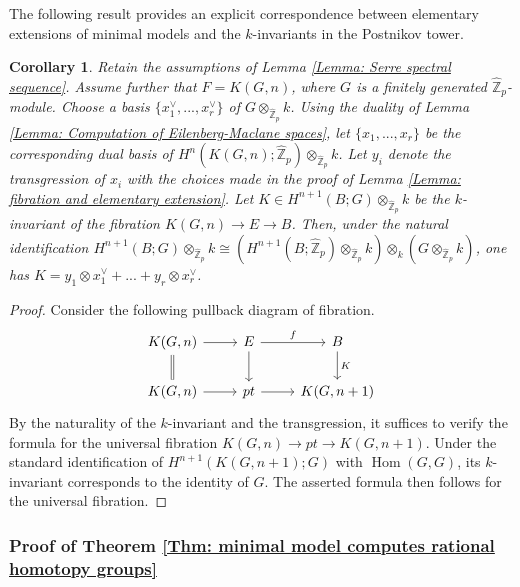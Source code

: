 \documentclass[11pt]{amsart}
\newtheorem{corollary}[theorem]{Corollary}
\theoremstyle{definition}
\numberwithin{equation}{section}
\numberwithin{equation}{section}
\newcommand\ZZ{\mathbb{Z}}
\DeclareMathOperator{\homo}{Hom}
\begin{document}
The following result provides an explicit  correspondence between elementary extensions of minimal models and the $k$-invariants in the Postnikov tower.

\begin{corollary}\label{Cor: k-invariant computation}
Retain the assumptions of Lemma \ref{Lemma: Serre spectral sequence}. Assume further that $F=K(G,n)$, where $G$ is a finitely generated $\widehat{\ZZ}_p$-module. Choose a basis $\{x^{\vee}_1,...,x^{\vee}_r\}$ of $G\otimes_{\widehat{\ZZ}_p} k$. Using the duality of Lemma \ref{Lemma: Computation of Eilenberg-Maclane spaces}, let $\{x_1,...,x_r\}$ be the corresponding dual basis of $H^n(K(G,n);\widehat{\ZZ}_p)\otimes_{\widehat{\ZZ}_p} k$. Let $y_i$ denote the transgression of $x_i$ with the choices made in the proof of Lemma \ref{Lemma: fibration and elementary extension}. Let $K \in H^{n+1}(B;G)\otimes_{\widehat{\ZZ}_p} k$ be the $k$-invariant of the fibration $K(G,n)\rightarrow E \rightarrow B$.  Then, under the natural identification $H^{n+1}(B;G)\otimes_{\widehat{\ZZ}_p} k\cong (H^{n+1}(B;\widehat{\ZZ}_p)\otimes_{\widehat{\ZZ}_p} k)\otimes_{k} (G\otimes_{\widehat{\ZZ}_p} k)$, one has $K=y_1\otimes x^{\vee}_1+...+y_r\otimes x^{\vee}_r$.
\end{corollary}

\begin{proof}
Consider the following pullback diagram of fibration.
\[
\begin{tikzcd}
    K(G,n) \arrow[d,equal] 
    \arrow[r] &  E \arrow[d] \arrow[r,"f"] & B \arrow[d,"K"] \\
    K(G,n) \arrow[r] &
    pt \arrow[r] 
     & K(G,n+1)
\end{tikzcd}
\]
By the naturality of the $k$-invariant and the transgression, it suffices to verify the formula for the universal fibration $K(G,n)\rightarrow pt\rightarrow K(G,n+1)$. Under the standard identification of $H^{n+1}(K(G,n+1);G)$ with $\homo(G,G)$, its $k$-invariant corresponds to the identity of $G$. The asserted formula then follows for the universal fibration.
\end{proof}

\subsubsection{Proof of Theorem \ref{Thm: minimal model computes rational homotopy groups}}\,
\end{document}
